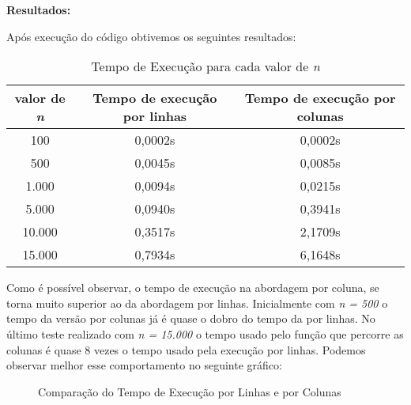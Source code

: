 \documentclass[a4paper, 12pt]{article}
\begin{document}
	
	\textbf{Resultados:}
	
	Após execução do código obtivemos os seguintes resultados:
	
	\begin{table}[ht]
		\centering
		\begin{tabular}{|c|c|c|}
			\hline
			\textbf{valor de \textit{n}} & \textbf{Tempo de execução por linhas} & \textbf{Tempo de execução por colunas}  \\
			\hline
			100 & 0,0002s & 0,0002s \\
			500 & 0,0045s & 0,0085s \\
			1.000 & 0,0094s & 0,0215s \\
			5.000 & 0,0940s & 0,3941s \\
			10.000 & 0,3517s & 2,1709s \\
			15.000 & 0,7934s & 6,1648s \\
			\hline
		\end{tabular}
		\caption{Tempo de Execução para cada valor de \textit{n}}
	\end{table}
	
	Como é possível observar, o tempo de execução na abordagem por coluna, se torna muito superior ao da abordagem por linhas. Inicialmente com \textit{n = 500} o tempo da versão por colunas já é quase o dobro do tempo da por linhas. No último teste realizado com \textit{n = 15.000} o tempo usado pelo função que percorre as colunas é quase 8 vezes o tempo usado pela execução por linhas. Podemos observar melhor esse comportamento no seguinte gráfico:
	
	\begin{figure}[h!]
		\centering
		\caption{Comparação do Tempo de Execução por Linhas e por Colunas}
	\end{figure}
	
\end{document}
